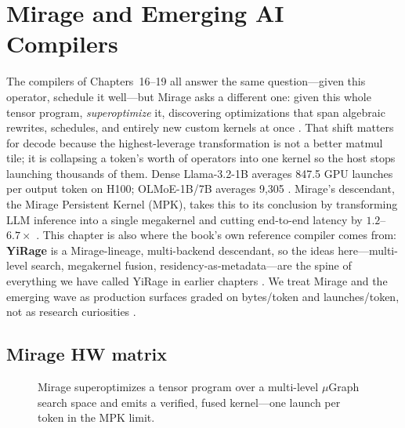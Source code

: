 \chapter{Mirage and Emerging AI Compilers}
\label{chap:ch20}

The compilers of Chapters~16--19 all answer the same question---given this operator, schedule it well---but Mirage asks a different one: given this whole tensor program, \emph{superoptimize} it, discovering optimizations that span algebraic rewrites, schedules, and entirely new custom kernels at once \citep{wu2024mirage}. That shift matters for decode because the highest-leverage transformation is not a better matmul tile; it is collapsing a token's worth of operators into one kernel so the host stops launching thousands of them. Dense Llama-3.2-1B averages 847.5 GPU launches per output token on H100; OLMoE-1B/7B averages 9{,}305 \citep{taxbreak2026}. Mirage's descendant, the Mirage Persistent Kernel (MPK), takes this to its conclusion by transforming LLM inference into a single megakernel and cutting end-to-end latency by $1.2$--$6.7\times$ \citep{mpk2025}.
This chapter is also where the book's own reference compiler comes from: \textbf{YiRage} is a Mirage-lineage, multi-backend descendant, so the ideas here---multi-level search, megakernel fusion, residency-as-metadata---are the spine of everything we have called YiRage in earlier chapters \citep{yirage2026}. We treat Mirage and the emerging wave as production surfaces graded on bytes/token and launches/token, not as research curiosities \citep{memoryfloor2026,patel2025llminference}.

\section{Mirage HW matrix}
\label{sec:ch20_mirage_hw_matrix}


\begin{figure}[t]
\centering
{}
\caption{Mirage superoptimizes a tensor program over a multi-level $\mu$Graph search space and emits a verified, fused kernel---one launch per token in the MPK limit.}
\label{fig:mirage_hw_matrix_pipeline}
\end{figure}


